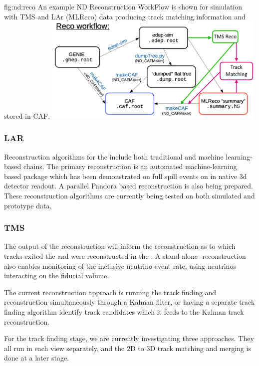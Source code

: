 \documentclass[../main-v1.tex]{subfiles}
\begin{document}
\begin{dunefigure}
{fig:nd:reco}
{An example ND Reconstruction WorkFlow is shown for simulation with TMS and LAr (MLReco) data producing track matching information and stored in CAF.}
{\includegraphics[width=0.8\textwidth]{graphics/ND/ND-Reco-workflow.png}}
\end{dunefigure}

\subsubsection{LAR}
 Reconstruction algorithms for the  include both traditional and machine learning-based chains. The primary reconstruction is an automated machine-learning based package which has been demonstrated on full spill events on in native 3d detector readout. A parallel Pandora based reconstruction is also being prepared. These reconstruction algorithms are currently being tested on both simulated and prototype data. 

\subsubsection{TMS}
The output of the  reconstruction will inform the  reconstruction as to which tracks exited the  and were reconstructed in the . A stand-alone -reconstruction also enables monitoring of the inclusive neutrino event rate, using neutrinos interacting on the  fiducial volume.

The current  reconstruction approach is running the track finding and reconstruction simultaneously through a Kalman filter, or having a separate track finding algorithm identify track candidates which it feeds to the Kalman track reconstruction.

For the track finding stage, we are currently investigating three approaches. They all run in each view separately, and the 2D to 3D track matching and merging is done at a later stage.
\end{document}
